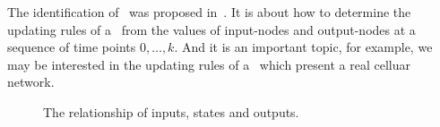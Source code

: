 The identification of \BCNs\ was proposed in~\cite{Cheng2011Identification}. It is about how to determine the updating rules of a \BCN\ from the values of  input-nodes  and output-nodes at a sequence of time points $0,\ldots, k$. And it is an important topic, for example, we may be interested in the updating rules of a \BCN\ which present a real celluar network. 



\begin{figure}[!t]
      \centering
      
      \caption{The relationship of inputs, states and outputs.}
      \label{fig:10}
  \end{figure}


